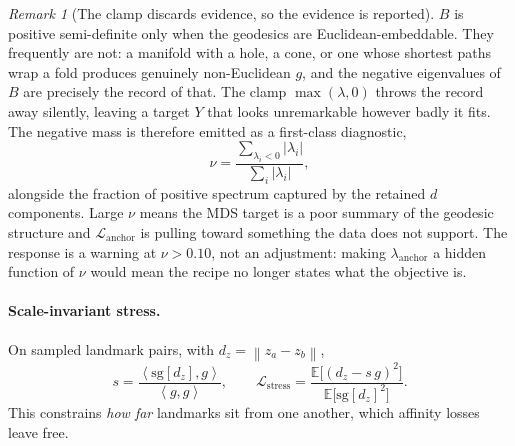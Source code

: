 \documentclass[12pt]{iopart}
\theoremstyle{definition}
\theoremstyle{plain}
\theoremstyle{remark}
\newtheorem{remark}{Remark}
\newcommand{\E}{\mathbb{E}}
\newcommand{\norm}[1]{\left\lVert#1\right\rVert}
\newcommand{\abs}[1]{\left\lvert#1\right\rvert}
\newcommand{\inner}[2]{\left\langle #1,#2\right\rangle}
\newcommand{\loss}{\mathcal{L}}
\begin{document}
\begin{remark}[The clamp discards evidence, so the evidence is reported]
\label{rem:negeigen}
$B$ is positive semi-definite only when the geodesics are
Euclidean-embeddable. They frequently are not: a manifold with a hole, a cone,
or one whose shortest paths wrap a fold produces genuinely non-Euclidean $g$,
and the negative eigenvalues of $B$ are precisely the record of that. The clamp
$\max(\lambda,0)$ throws the record away silently, leaving a target $Y$ that
looks unremarkable however badly it fits. The negative mass is therefore
emitted as a first-class diagnostic,
\begin{equation}
\label{eq:negeigen}
\nu = \frac{\sum_{\lambda_i<0}\abs{\lambda_i}}{\sum_i\abs{\lambda_i}},
\end{equation}
alongside the fraction of positive spectrum captured by the retained $d$
components. Large $\nu$ means the MDS target is a poor summary of the geodesic
structure and $\loss_{\mathrm{anchor}}$ is pulling toward something the data
does not support. The response is a warning at $\nu>0.10$, not an adjustment:
making $\lambda_{\mathrm{anchor}}$ a hidden function of $\nu$ would mean the
recipe no longer states what the objective is.
\end{remark}

\paragraph{Scale-invariant stress.}
On sampled landmark pairs, with $d_z=\norm{z_a-z_b}$,
\begin{equation}
\label{eq:stress}
s = \frac{\inner{\mathrm{sg}[d_z]}{g}}{\inner{g}{g}},
\qquad
\loss_{\mathrm{stress}}
=
\frac{\E\bigl[(d_z-s\,g)^2\bigr]}{\E\bigl[\mathrm{sg}[d_z]^2\bigr]}.
\end{equation}
This constrains \emph{how far} landmarks sit from one another, which affinity
losses leave free.
\end{document}
